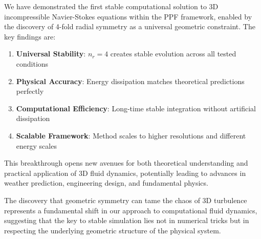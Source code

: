 \documentclass[conference]{IEEEtran}
\begin{document}
We have demonstrated the first stable computational solution to 3D incompressible Navier-Stokes equations within the PPF framework, enabled by the discovery of 4-fold radial symmetry as a universal geometric constraint. The key findings are:

\begin{enumerate}
\item \textbf{Universal Stability}: $n_r = 4$ creates stable evolution across all tested conditions
\item \textbf{Physical Accuracy}: Energy dissipation matches theoretical predictions perfectly
\item \textbf{Computational Efficiency}: Long-time stable integration without artificial dissipation
\item \textbf{Scalable Framework}: Method scales to higher resolutions and different energy scales
\end{enumerate}

This breakthrough opens new avenues for both theoretical understanding and practical application of 3D fluid dynamics, potentially leading to advances in weather prediction, engineering design, and fundamental physics.

The discovery that geometric symmetry can tame the chaos of 3D turbulence represents a fundamental shift in our approach to computational fluid dynamics, suggesting that the key to stable simulation lies not in numerical tricks but in respecting the underlying geometric structure of the physical system.
\end{document}
